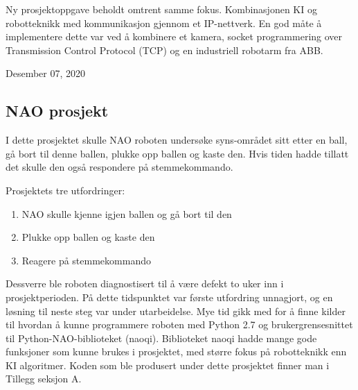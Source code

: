 \documentclass[conference]{IEEEtran}
\begin{document}
Ny prosjektoppgave beholdt omtrent samme fokus. Kombinasjonen KI og robotteknikk med kommunikasjon gjennom et IP-nettverk. En god måte å implementere 
dette var ved å kombinere et kamera, socket programmering over Transmission Control Protocol  (TCP) og en industriell robotarm fra ABB.
 
\hfill Desember 07, 2020

    \subsection{NAO prosjekt}
        I dette prosjektet skulle NAO roboten undersøke syns-området sitt etter en ball, gå bort til denne ballen, plukke opp ballen og kaste 
        den. Hvis tiden hadde tillatt det skulle den også respondere på stemmekommando. 

        Prosjektets tre utfordringer:
        \begin{enumerate}
            \item NAO skulle kjenne igjen ballen og gå bort til den
            \item Plukke opp ballen og kaste den
            \item Reagere på stemmekommando 
        \end{enumerate}
        
        Dessverre ble roboten diagnostisert til å være defekt to uker inn i prosjektperioden. På dette tidspunktet var første utfordring unnagjort, 
        og en løsning til neste steg var under utarbeidelse. Mye tid gikk med for å finne kilder til hvordan å kunne programmere roboten med Python 2.7 
        og brukergrensesnittet til Python-NAO-biblioteket (naoqi). Biblioteket naoqi hadde mange gode funksjoner som kunne brukes i prosjektet, med 
        større fokus på robotteknikk enn KI algoritmer. Koden som ble produsert under dette prosjektet finner man i Tillegg seksjon A.
\end{document}
